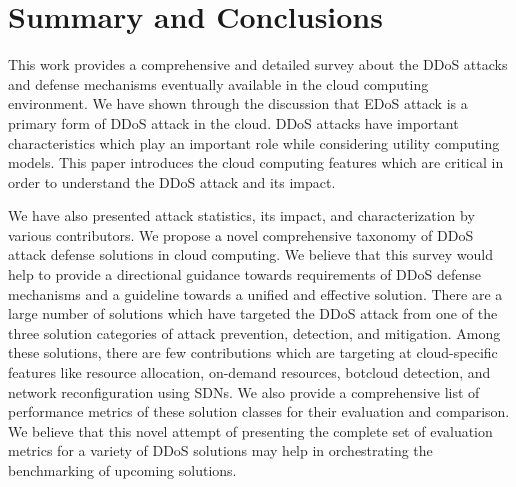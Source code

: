 \documentclass[final,5p,times,twocolumn]{elsarticle}
\begin{document}
\section{Summary and Conclusions}
\label{conc}
{This work provides a comprehensive and detailed survey about the DDoS attacks and defense mechanisms eventually available in the cloud computing environment. We have shown through the discussion that EDoS attack is a primary form of DDoS attack in the cloud. DDoS attacks have important characteristics which play an important role while considering utility computing models. This paper introduces the cloud computing features which are critical in order to understand the DDoS attack and its impact. }

{We have also presented attack statistics, its impact, and characterization by various contributors. We propose a novel comprehensive taxonomy of DDoS attack defense solutions in cloud computing. We believe that this survey would help to provide a directional guidance towards requirements of DDoS defense mechanisms and a guideline towards a unified and effective solution. There are a large number of solutions which have targeted the DDoS attack from one of the three solution categories of attack prevention, detection, and mitigation. Among these solutions, there are few contributions which are targeting at cloud-specific features like resource allocation, on-demand resources, botcloud detection, and network reconfiguration using SDNs. We also provide a comprehensive list of performance metrics of these solution classes for their evaluation and comparison. We believe that this novel attempt of presenting the complete set of evaluation metrics for a variety of DDoS solutions may help in orchestrating the benchmarking of upcoming solutions.}
\end{document}
